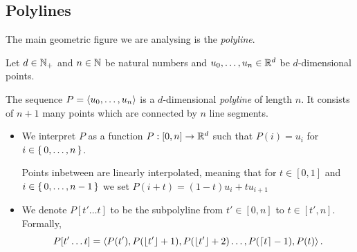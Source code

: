 \subsection{Polylines}
\label{ssec:polylines}
The main geometric figure we are analysing is the \emph{polyline}.
\begin{definition}
  Let \(d\in \mathbb{N}_+\) and \(n \in \mathbb{N}\) be natural numbers and \(u_0, \dots, u_n \in \mathbb{R}^d\) be \(d\)-dimensional points. 

  The sequence \(P = \left\langle u_0, \dots, u_n\right\rangle\) is a \(d\)-dimensional \emph{polyline} of length \(n\). It consists of \(n+1\) many points which are connected by \(n\) line segments. 

  \begin{itemize}
    \item We interpret \(P\) as a function \(P:[0,n] \to \mathbb{R}^d\) such that \(P(i) = u_i\) for \(i \in \set{0, \dots, n}\).

      Points inbetween are linearly interpolated, meaning that for \(t \in [0, 1]\) and \(i \in \set{0, \dots, n - 1}\) we set \(P(i + t) = (1- t)u_i + t u_{i+1}\)
    \item We denote \(P[t'\dots t]\) to be the subpolyline from \(t' \in [0, n]\) to \(t \in [t', n]\). Formally, \[P[t'\dots t] = \left\langle P(t'), P(\left\lfloor t'\right\rfloor + 1),  P(\left\lfloor t'\right\rfloor + 2) \dots, P(\left\lceil t\right\rceil - 1), P(t)\right\rangle.\]
  \end{itemize}

\end{definition}

